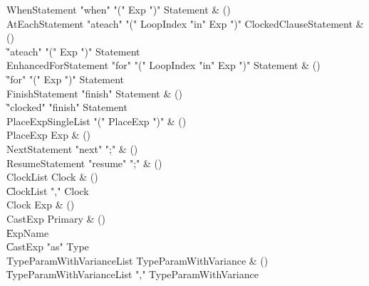 \begin{bbgrammar}

 WhenStatement  \label{prod:WhenStatement}  \: \xcd"when" \xcd"(" Exp \xcd")" Statement & ()\\
 AtEachStatement  \label{prod:AtEachStatement}  \: \xcd"ateach" \xcd"(" LoopIndex \xcd"in" Exp \xcd")" ClockedClause\opt Statement & ()\\
    \| \xcd"ateach" \xcd"(" Exp \xcd")" Statement\\
 EnhancedForStatement  \label{prod:EnhancedForStatement}  \: \xcd"for" \xcd"(" LoopIndex \xcd"in" Exp \xcd")" Statement & ()\\
    \| \xcd"for" \xcd"(" Exp \xcd")" Statement\\
 FinishStatement  \label{prod:FinishStatement}  \: \xcd"finish" Statement & ()\\
    \| \xcd"clocked" \xcd"finish" Statement\\
 PlaceExpSingleList  \label{prod:PlaceExpSingleList}  \: \xcd"(" PlaceExp \xcd")" & ()\\
 PlaceExp  \label{prod:PlaceExp}  \: Exp & ()\\
 NextStatement  \label{prod:NextStatement}  \: \xcd"next" \xcd";" & ()\\
 ResumeStatement  \label{prod:ResumeStatement}  \: \xcd"resume" \xcd";" & ()\\
 ClockList  \label{prod:ClockList}  \: Clock & ()\\
    \| ClockList \xcd"," Clock\\
 Clock  \label{prod:Clock}  \: Exp & ()\\
 CastExp  \label{prod:CastExp}  \: Primary & ()\\
    \| ExpName\\
    \| CastExp \xcd"as" Type\\
 TypeParamWithVarianceList  \label{prod:TypeParamWithVarianceList}  \: TypeParamWithVariance & ()\\
    \| TypeParamWithVarianceList \xcd"," TypeParamWithVariance\\

\end{bbgrammar}
